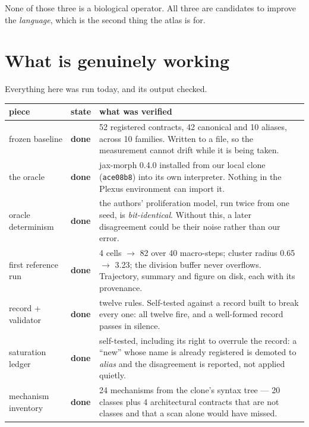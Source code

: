 \documentclass[11pt,a4paper]{article}
\newcommand{\code}[1]{\texttt{#1}}
\newcommand{\dn}{\textcolor{good}{\textbf{done}}}
\begin{document}
None of those three is a biological operator. All three are candidates to improve the
\emph{language}, which is the second thing the atlas is for.

\section{What is genuinely working}

Everything here was run today, and its output checked.

\begin{center}
\small
\begin{tabular}{@{}p{4.3cm} l p{8.7cm}@{}}
\toprule
\textbf{piece} & \textbf{state} & \textbf{what was verified}\\
\midrule
frozen baseline & \dn &
52 registered contracts, 42 canonical and 10 aliases, across 10 families. Written to a file, so
the measurement cannot drift while it is being taken.\\

the oracle & \dn &
jax-morph 0.4.0 installed from our local clone (\code{ace08b8}) into its own interpreter. Nothing
in the Plexus environment can import it.\\

oracle determinism & \dn &
the authors' proliferation model, run twice from one seed, is \emph{bit-identical}. Without this,
a later disagreement could be their noise rather than our error.\\

first reference run & \dn &
4 cells $\to$ 82 over 40 macro-steps; cluster radius 0.65 $\to$ 3.23; the division buffer never
overflows. Trajectory, summary and figure on disk, each with its provenance.\\

record + validator & \dn &
twelve rules. Self-tested against a record built to break every one: all twelve fire, and a
well-formed record passes in silence.\\

saturation ledger & \dn &
self-tested, including its right to overrule the record: a ``new'' whose name is already
registered is demoted to \emph{alias} and the disagreement is reported, not applied quietly.\\

mechanism inventory & \dn &
24 mechanisms from the clone's syntax tree --- 20 classes plus 4 architectural contracts that are
not classes and that a scan alone would have missed.\\


\end{tabular}
\end{center}
\end{document}
